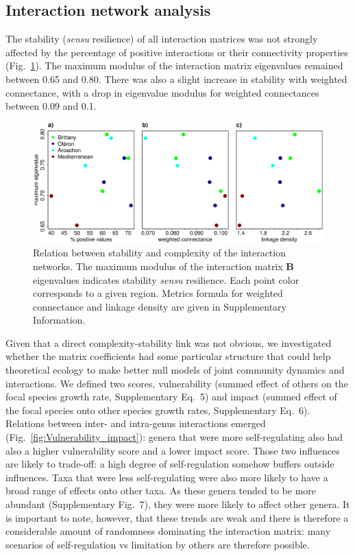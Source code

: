 \documentclass[9pt,twocolumn,twoside,lineno]{pnas-new}
\begin{document}
\subsection*{Interaction network analysis}

The stability (\emph{sensu} resilience\cite{ives_stability_2007})
of all interaction matrices was not strongly affected by the percentage
of positive interactions or their connectivity properties (Fig.~\ref{fig:Stability-community}).
The maximum modulus of the interaction matrix eigenvalues remained
between 0.65 and 0.80. There was also a slight increase in stability
with weighted connectance, with a drop in eigenvalue modulus for weighted
connectances between 0.09 and 0.1.

\begin{figure}[!h]
\centering
\includegraphics[width=17.8cm]{complexity_stability_MainFig_pencenjustB}
\caption{Relation between stability and complexity of the interaction
networks. The maximum modulus of the interaction matrix $\mathbf{B}$
eigenvalues indicates stability \emph{sensu} resilience. Each point
color corresponds to a given region. Metrics formula for weighted
connectance and linkage density are given in Supplementary Information.}
\label{fig:Stability-community}
\end{figure}

Given that a direct complexity-stability link was not obvious, we
investigated whether the matrix coefficients had some particular structure
that could help theoretical ecology to make better null models of
joint community dynamics and interactions\cite{james_constructing_2015}.
We defined two scores, vulnerability (summed effect of others on
the focal species growth rate, Supplementary Eq.~5) and impact (summed
effect of the focal species onto other species growth rates, Supplementary
Eq.~6). Relations between inter- and intra-genus interactions emerged
(Fig.~\ref{fig:Vulnerability_impact}): genera that were more self-regulating
also had also a higher vulnerability score and a lower impact score.
Those two influences are likely to trade-off: a high degree of self-regulation
somehow buffers outside influences. Taxa that were less self-regulating
were also more likely to have a broad range of effects onto other
taxa. As these genera tended to be more abundant (Supplementary Fig.~7),
they were more likely to affect other genera. It is important to note,
however, that these trends are weak and there is therefore a considerable
amount of randomness dominating the interaction matrix: many scenarios
of self-regulation vs limitation by others are therefore possible.
\end{document}
